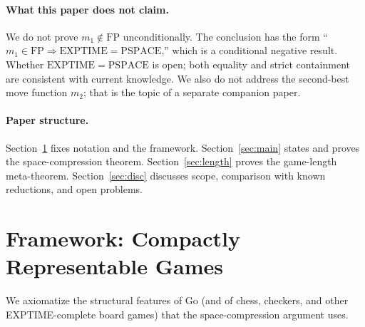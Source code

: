 \documentclass[11pt,a4paper]{amsart}
\theoremstyle{plain}
\theoremstyle{definition}
\theoremstyle{remark}
\newcommand{\FP}{\mathrm{FP}}
\newcommand{\EXPTIME}{\mathrm{EXPTIME}}
\newcommand{\PSPACE}{\mathrm{PSPACE}}
\begin{document}
\paragraph{What this paper does not claim.}
We do not prove $m_1 \notin \FP$ unconditionally. The conclusion has
the form ``$m_1 \in \FP \Rightarrow \EXPTIME = \PSPACE$,'' which is a
conditional negative result. Whether $\EXPTIME = \PSPACE$ is open;
both equality and strict containment are consistent with current
knowledge. We also do not address the second-best move function $m_2$;
that is the topic of a separate companion paper.

\paragraph{Paper structure.}
Section~\ref{sec:framework} fixes notation and the framework.
Section~\ref{sec:main} states and proves the space-compression
theorem. Section~\ref{sec:length} proves the game-length
meta-theorem. Section~\ref{sec:disc} discusses scope, comparison with
known reductions, and open problems.

\section{Framework: Compactly Representable Games}
\label{sec:framework}

We axiomatize the structural features of Go (and of chess, checkers,
and other EXPTIME-complete board games) that the space-compression
argument uses.
\end{document}
